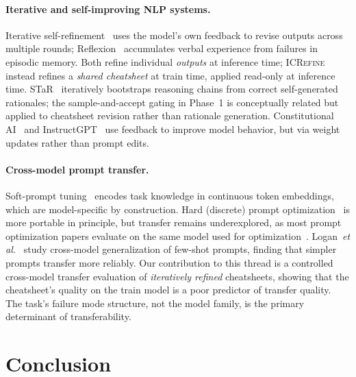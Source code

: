\documentclass{article}
\begin{document}
\paragraph{Iterative and self-improving NLP systems.}
Iterative self-refinement~\citep{madaan2023selfrefine} uses the model's own feedback to
revise outputs across multiple rounds; Reflexion~\citep{shinn2023reflexion} accumulates
verbal experience from failures in episodic memory.
Both refine individual \emph{outputs} at inference time; \textsc{ICRefine} instead refines a
\emph{shared cheatsheet} at train time, applied read-only at inference time.
STaR~\citep{zelikman2022star} iteratively bootstraps reasoning chains from correct
self-generated rationales; the sample-and-accept gating in Phase~1 is conceptually
related but applied to cheatsheet revision rather than rationale generation.
Constitutional AI~\citep{bai2022constitutional} and InstructGPT~\citep{ouyang2022instructgpt}
use feedback to improve model behavior, but via weight updates rather than prompt edits.

\paragraph{Cross-model prompt transfer.}
Soft-prompt tuning~\citep{lester2021power} encodes task knowledge in continuous token
embeddings, which are model-specific by construction.
Hard (discrete) prompt optimization~\citep{ape2022,opro2023} is more portable in principle,
but transfer remains underexplored, as most prompt optimization papers evaluate on the same
model used for optimization~\citep{chen2023modelagnostic}.
Logan~\textit{et al.}~\citep{logan2021cutting} study cross-model generalization of few-shot
prompts, finding that simpler prompts transfer more reliably.
Our contribution to this thread is a controlled cross-model transfer evaluation of
\emph{iteratively refined} cheatsheets, showing that the cheatsheet's quality on the train
model is a poor predictor of transfer quality. The task's failure mode structure, not the model family, is the primary determinant of transferability.




\section{Conclusion}
\label{sec:conclusion}
\end{document}
